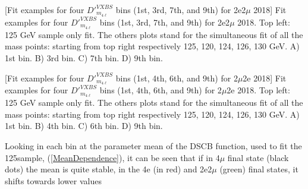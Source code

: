 \begin{multiFigure}
    \centering
        [Fit examples for four $D'^{VXBS}_{m_{4\ell}}$ bins (1st, 3rd, 7th, and 9th) for 2e2$\mu$ 2018]
        {Fit examples for four $D'^{VXBS}_{m_{4\ell}}$ bins (1st, 3rd, 7th, and 9th) 
        for 2e2$\mu$ 2018. Top left: 125 GeV sample only fit. The others plots stand for the simultaneous 
        fit of all the mass points: starting from top right respectively 125, 120, 124, 126, 130 GeV.
        \;A) 1st bin.
        \;B) 3rd bin.
        \;C) 7th bin.
        \;D) 9th bin.} %
        \label{signal_lineshape_2018_2e2mu}
\end{multiFigure}
\begin{multiFigure}
    \centering
        [Fit examples for four $D'^{VXBS}_{m_{4\ell}}$ bins (1st, 4th, 6th, and 9th) 
        for 2$\mu$2e 2018]
        {Fit examples for four $D'^{VXBS}_{m_{4\ell}}$ bins (1st, 4th, 6th, and 9th) 
        for 2$\mu$2e 2018. Top left: 125 GeV sample only fit. The others plots stand for the simultaneous 
        fit of all the mass points: starting from top right respectively 125, 120, 124, 126, 130 GeV.
        \;A) 1st bin.
        \;B) 4th bin.
        \;C) 6th bin.
        \;D) 9th bin.} %
    \label{signal_lineshape_2018_2mu2e}
\end{multiFigure}
Looking in each bin at the parameter mean of the DSCB function, used to fit the 125\GeV sample, 
(\cref{MeanDependence}), it can be seen that if in 4$\mu$ final state (black dots) the mean
is quite stable, in the 4e (in red) and 2e2$\mu$ (green) final states, it shifts towards lower values
